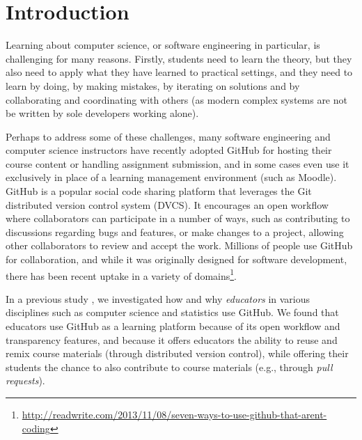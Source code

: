 \section{Introduction}


Learning about computer science, or software engineering in particular, is challenging for many reasons.  Firstly, students need to learn the theory, but they also need to apply what they have learned to practical settings, and they need to learn by doing, by making mistakes, by iterating on solutions and by collaborating and coordinating with others (as modern complex systems are not be written by sole developers working alone).

Perhaps to address some of these challenges, many software engineering and computer science instructors have recently adopted GitHub for hosting their course content or handling assignment submission, and in some cases even use it exclusively in place of a learning management environment (such as Moodle).
%
GitHub is a popular social code sharing platform that leverages the Git distributed version control system (DVCS). It encourages an open workflow where collaborators can participate in a number of ways, such as contributing to discussions regarding bugs and features, or make changes to a project, allowing other collaborators to review and accept the work. Millions of people use GitHub for collaboration, and while it was originally designed for software development, there has been recent uptake in a variety of domains\footnote{\url{http://readwrite.com/2013/11/08/seven-ways-to-use-github-that-arent-coding}}.

 In a previous study \cite{zagalsky2015emergence}, we investigated how and why \emph{educators} in various disciplines such as computer science and statistics use GitHub. We found that educators use GitHub as a learning platform because of its open workflow and transparency features, and because it offers educators the ability to reuse and remix course materials (through distributed version control), while offering their students the chance to also contribute to course materials (e.g., through \emph{pull requests}).

